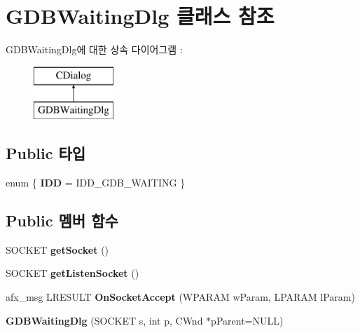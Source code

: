 \hypertarget{class_g_d_b_waiting_dlg}{}\section{G\+D\+B\+Waiting\+Dlg 클래스 참조}
\label{class_g_d_b_waiting_dlg}
G\+D\+B\+Waiting\+Dlg에 대한 상속 다이어그램 \+: \begin{figure}[H]
\begin{center}
\leavevmode
\includegraphics[height=2.000000cm]{class_g_d_b_waiting_dlg}
\end{center}
\end{figure}
\subsection*{Public 타입}
\begin{DoxyCompactItemize}
\item 
\mbox{\label{class_g_d_b_waiting_dlg_aa533de8ec8419795c0d1572d637c9101}} 
enum \{ {\bfseries I\+DD} = I\+D\+D\+\_\+\+G\+D\+B\+\_\+\+W\+A\+I\+T\+I\+NG
 \}
\end{DoxyCompactItemize}
\subsection*{Public 멤버 함수}
\begin{DoxyCompactItemize}
\item 
\mbox{\label{class_g_d_b_waiting_dlg_a21c7ce6a732f447fbdb277f0c6b596d3}} 
S\+O\+C\+K\+ET {\bfseries get\+Socket} ()
\item 
\mbox{\label{class_g_d_b_waiting_dlg_ab5fef2284ac8d9ea1b93f05dc4832438}} 
S\+O\+C\+K\+ET {\bfseries get\+Listen\+Socket} ()
\item 
\mbox{\label{class_g_d_b_waiting_dlg_a086e273c913d5f12449f04a80956d9ee}} 
afx\+\_\+msg L\+R\+E\+S\+U\+LT {\bfseries On\+Socket\+Accept} (W\+P\+A\+R\+AM w\+Param, L\+P\+A\+R\+AM l\+Param)
\item 
\mbox{\label{class_g_d_b_waiting_dlg_ad71a7ff67a8f328efb264ac69af7cd8f}} 
{\bfseries G\+D\+B\+Waiting\+Dlg} (S\+O\+C\+K\+ET s, int p, C\+Wnd $\ast$p\+Parent=N\+U\+LL)
\end{DoxyCompactItemize}
